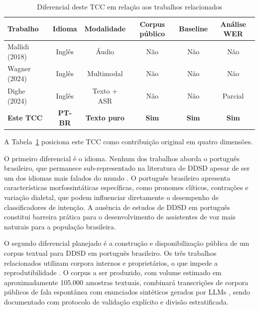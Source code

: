 \documentclass[
    12pt,                %
    openright,           %
    oneside,             %
    a4paper,             %
    english,             %
    brazil               %
]{abntex2}
\begin{document}
\vspace{0.4cm}

\begin{table}[htb]
    \centering
    \caption{Diferencial deste TCC em relação aos trabalhos relacionados}
    \label{tab:diferencial_tcc}
    \begin{tabular}{l|c|c|c|c|c}
        \toprule
        \textbf{Trabalho}
            & \textbf{Idioma}
            & \textbf{Modalidade}
            & \textbf{Corpus público}
            & \textbf{Baseline}
            & \textbf{Análise WER} \\
        \midrule
        Mallidi (2018)
            & Inglês & Áudio        & Não & Não & Não \\
        \midrule
        Wagner (2024)
            & Inglês & Multimodal   & Não & Não & Não \\
        \midrule
        Dighe (2024)
            & Inglês & Texto + ASR  & Não & Não & Parcial \\
        \midrule
        \textbf{Este TCC}
            & \textbf{PT-BR}
            & \textbf{Texto puro}
            & \textbf{Sim}
            & \textbf{Sim}
            & \textbf{Sim} \\
        \bottomrule
    \end{tabular}
\end{table}

\vspace{0.4cm}

A Tabela~\ref{tab:diferencial_tcc} posiciona este TCC como contribuição original em quatro dimensões.

O primeiro diferencial é o idioma. Nenhum dos trabalhos aborda o português brasileiro, que permanece sub-representado na literatura de DDSD apesar de ser um dos idiomas mais falados do mundo \cite{CORAA2023}. O português brasileiro apresenta características morfossintáticas específicas, como pronomes clíticos, contrações e variação dialetal, que podem influenciar diretamente o desempenho de classificadores de intenção. A ausência de estudos de DDSD em português constitui barreira prática para o desenvolvimento de assistentes de voz mais naturais para a população brasileira.

O segundo diferencial planejado é a construção e disponibilização pública de um corpus textual para DDSD em português brasileiro. Os três trabalhos relacionados utilizam corpora internos e proprietários, o que impede a reprodutibilidade \cite{Wazlawick2020}. O corpus a ser produzido, com volume estimado em aproximadamente 105.000 amostras textuais, combinará transcrições de corpora públicos de fala espontânea \cite{CORAA2023, NURCSP2025, Tagarela2026} com enunciados sintéticos gerados por LLMs \cite{Møller2024}, sendo documentado com protocolo de validação explícito e divisão estratificada.
\end{document}
